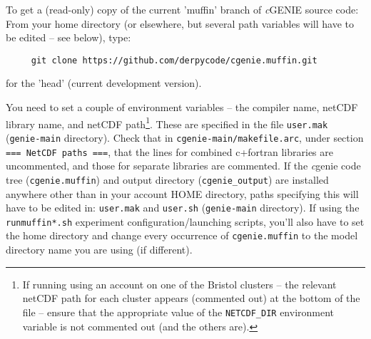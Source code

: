 \documentclass[10pt,twoside]{article}
\begin{document}
\begin{compactenum}
\item To get a (read-only) copy of the current 'muffin' branch of
  \textit{c}GENIE source code: \\ From your home directory (or
  elsewhere, but several path variables will have to be edited -- see
  below), type:
  \vspace{-5pt}
  \begin{verbatim}
     git clone https://github.com/derpycode/cgenie.muffin.git
\end{verbatim}
  \vspace{-5pt} for the 'head' (current development version).

\item You need to set a couple of environment variables -- the
  compiler name, netCDF library name, and netCDF path\footnote{If
    running using an account on one of the Bristol clusters -- the
    relevant netCDF path for each cluster appears (commented out) at
    the bottom of the file -- ensure that the appropriate value of the
    \texttt{NETCDF\_DIR} environment variable is not commented out
    (and the others are).}. These are specified in the file
  \texttt{user.mak} (\texttt{genie-main} directory).  Check that in
  \texttt{cgenie-main/makefile.arc}, under section \texttt{=== NetCDF
    paths ===}, that the lines for combined c+fortran libraries are
  uncommented, and those for separate libraries are commented.  If the
  \textit{c}genie code tree (\texttt{cgenie.muffin}) and output
  directory (\texttt{cgenie\_output}) are installed anywhere other
  than in your account HOME directory, paths specifying this will have
  to be edited in: \texttt{user.mak} and \texttt{user.sh}
  (\texttt{genie-main} directory). If using the \texttt{runmuffin*.sh}
  experiment configuration/launching scripts, you'll also have to set
  the home directory and change every occurrence of
  \texttt{cgenie.muffin} to the model directory name you are using (if
  different).



\end{compactenum}
\end{document}
